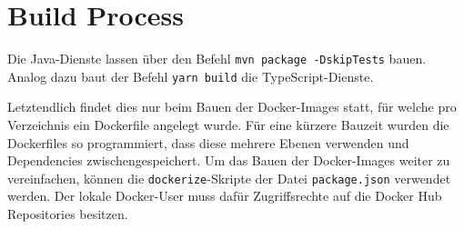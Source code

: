 \section{Build Process}

Die Java-Dienste lassen über den Befehl \verb|mvn package -DskipTests| bauen.
Analog dazu baut der Befehl \verb|yarn build| die TypeScript-Dienste.

Letztendlich findet dies nur beim Bauen der Docker-Images statt, für welche pro Verzeichnis ein Dockerfile angelegt wurde.
Für eine kürzere Bauzeit wurden die Dockerfiles so programmiert, dass diese mehrere Ebenen verwenden und Dependencies zwischengespeichert.
Um das Bauen der Docker-Images weiter zu vereinfachen, können die \verb|dockerize|-Skripte der Datei \break \verb|package.json| verwendet werden.
Der lokale Docker-User muss dafür Zugriffsrechte auf die Docker Hub Repositories besitzen.
